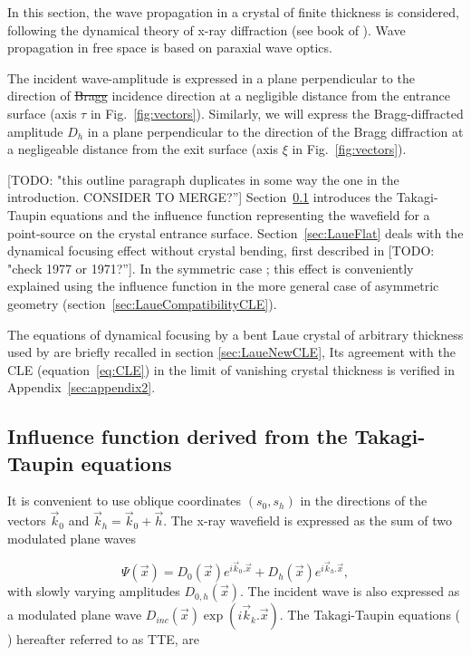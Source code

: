 \documentclass[preprint]{iucr}              %
\newcommand{\todo}[1]{{\color{red}[TODO: "#1'']}}
\newcommand{\inblue}[1]{{\color{blue}#1}}
\newcommand{\inred}[1]{{\color{red}#1}}
\begin{document}
In this section, the wave propagation in a crystal of finite thickness is considered, following the dynamical theory of x-ray diffraction (see book of \cite{authierbook}). Wave propagation in free space is based on paraxial wave optics.

The incident wave-amplitude is expressed in a plane perpendicular to the direction of \inred{\sout{Bragg}} incidence direction at a negligible distance from the entrance surface \inblue{(axis $\tau$ in Fig.~\ref{fig:vectors}).}
Similarly, we will express the Bragg-diffracted amplitude $D_h$ in a plane perpendicular to the direction of the Bragg diffraction at a negligeable distance from the exit surface \inblue{(axis $\xi$ in Fig.~\ref{fig:vectors}).}

\todo{this outline paragraph duplicates in some way the one in the introduction. CONSIDER TO MERGE?}
\inblue{Section~\ref{sec:influence} introduces the Takagi-Taupin equations and the influence function representing the wavefield for a point-source on the crystal entrance surface.
}
Section~\ref{sec:LaueFlat} deals with the dynamical focusing effect without crystal bending, first described in \cite{AfanasevKohn1977} \todo{check 1977 or 1971?}. In the symmetric case \cite{kushnir}; \cite{GuigayFerrero2013} this effect is conveniently explained using the influence function in the more general case of asymmetric geometry (section~\ref{sec:LaueCompatibilityCLE}). 


The equations of dynamical focusing by a bent Laue crystal of arbitrary thickness used by \cite{GuigayFerrero2016} are briefly recalled in section \ref{sec:LaueNewCLE},  Its agreement with the CLE (equation~\ref{eq:CLE}) in the limit of vanishing crystal thickness is verified in Appendix~\ref{sec:appendix2}.

\subsection{Influence function derived from the Takagi-Taupin equations}
\label{sec:influence}

It is convenient to use oblique coordinates $(s_0,s_h)$ in the directions of the vectors $\vec k_0$ and $\vec k_h=\vec k_0 + \vec h$. The x-ray wavefield is expressed as the sum of two modulated plane waves

\begin{equation}
    \Psi(\vec x) = D_0(\vec x) e^{i \vec k_0 . \vec x} + D_h(\vec x) e^{i \vec k_h . \vec x},
\end{equation}
with slowly varying amplitudes $D_{0,h}(\vec x)$. The incident wave is also expressed as a modulated plane wave $D_{inc}(\vec x) \exp(i\vec k_k . \vec x)$. The Takagi-Taupin equations  (\cite{Takagi} \cite{Takagi1962} \cite{Taupin} \cite{Taupin1967}) hereafter referred to as TTE, are
\end{document}
